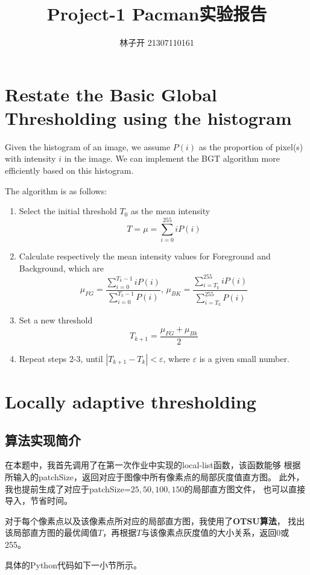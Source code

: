 \documentclass{article}
\title{Project-1 Pacman实验报告}
\author{林子开 21307110161}
\begin{document}
	\maketitle
	\tableofcontents

\section{Restate the Basic Global Thresholding using the histogram}
Given the histogram of an image, we assume $P(i)$ as the proportion 
of pixel(s) with intensity $i$ in the image. We can implement the BGT algorithm 
more efficiently based on this histogram.

The algorithm is as follows:
\begin{enumerate}
    \item Select the initial threshold $T_0$ as the mean intensity
        $$T =\mu = \sum_{i=0}^{255} i P(i)$$
    \item Calculate respectively the mean intensity values for Foreground and Background,
        which are $$\mu_{FG}=\frac{\sum_{i=0}^{T_k-1}iP(i)}{\sum_{i=0}^{T_k-1}P(i)}
        ,\, \mu_{BK}=\frac{\sum_{i=T_k}^{255}iP(i)}{\sum_{i=T_k}^{255}P(i)}$$
    \item Set a new threshold $$T_{k+1} = \frac{\mu_{FG}+\mu_{Bk}}{2}$$
    \item Repeat steps 2-3, until $|T_{k+1}-T_k|<\varepsilon$, 
        where $\varepsilon$ is a given small number.
\end{enumerate}



\section{Locally adaptive thresholding} 
\subsection{算法实现简介}
在本题中，我首先调用了在第一次作业中实现的local-list函数，该函数能够
根据所输入的patchSize，返回对应于图像中所有像素点的局部灰度值直方图。
此外，我也提前生成了对应于patchSize=$25,50,100,150$的局部直方图文件，
也可以直接导入，节省时间。

对于每个像素点以及该像素点所对应的局部直方图，我使用了\textbf{OTSU算法}，
找出该局部直方图的最优阈值$T$，再根据$T$与该像素点灰度值的大小关系，返回0或255。

具体的Python代码如下一小节所示。
\end{document}
